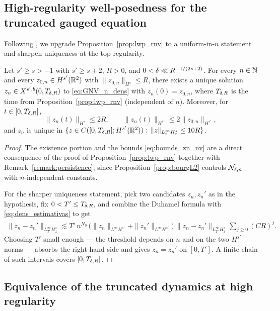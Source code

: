 \subsection{High-regularity well-posedness for the truncated gauged equation}

Following \cite[Lemma~5.4]{chcora}, we upgrade
Proposition~\ref{prop:lwp_rnv} to a uniform-in-$n$ statement and
sharpen uniqueness at the top regularity.

\begin{lemma}\label{lem:zn_nv}
Let $s'\ge s>-1$ with $s'\ge s+2$, $R>0$, and
$0<\delta\ll R^{-1/(2s+2)}$. For every $n\in\mathbb{N}$ and every
$z_{0,n}\in H^{s'}(\mathbb{R}^2)$ with $\|z_{0,n}\|_{H^s}\le R$, there exists
a unique solution $z_n\in X^{s',b}(0,T_{\delta,R})$ to
\eqref{eq:GNV_n_dens} with $z_n(0)=z_{0,n}$, where $T_{\delta,R}$ is
the time from Proposition~\ref{prop:lwp_rnv} (independent of $n$).
Moreover, for $t\in[0,T_{\delta,R}]$,
\begin{equation}\label{eq:bounds_zn_nv}
\|z_n(t)\|_{H^s}\le 2R,
\qquad
\|z_n(t)\|_{H^{s'}}\le 2\|z_{0,n}\|_{H^{s'}},
\end{equation}
and $z_n$ is unique in
$\{z\in C([0,T_{\delta,R}]; H^{s'}(\mathbb{R}^2)):\,
\|z\|_{L^\infty_t H^s_x}\le 10R\}$.
\end{lemma}

\begin{proof}
The existence portion and the bounds \eqref{eq:bounds_zn_nv} are a
direct consequence of the proof of Proposition~\ref{prop:lwp_rnv}
together with Remark~\ref{remark:persistence}, since
Proposition~\ref{prop:bourgL2} controls $\mathcal{N}_{\ell,n}$ with
$n$-independent constants.

For the sharper uniqueness statement, pick two candidates
$z_n,z_n'$ as in the hypothesis, fix $0<T'\le T_{\delta,R}$, and
combine the Duhamel formula with
\eqref{eq:dens_estimativas} to get
\begin{align*}
\|z_n-z_n'\|_{L^\infty_{T'}H^s_x}
\lesssim T'\, n^{N_0}\,
\big(\|z_n\|_{L^\infty H^{s'}}+\|z_n'\|_{L^\infty H^{s'}}\big)
\,\|z_n-z_n'\|_{L^\infty_{T'}H^s_x}
\sum_{j\ge 0}(CR)^j.
\end{align*}
Choosing $T'$ small enough --- the threshold depends on $n$ and on
the two $H^{s'}$ norms --- absorbs the right-hand side and gives
$z_n=z_n'$ on $[0,T']$. A finite chain of such intervals covers
$[0,T_{\delta,R}]$.
\end{proof}

\subsection{Equivalence of the truncated dynamics at high regularity}

